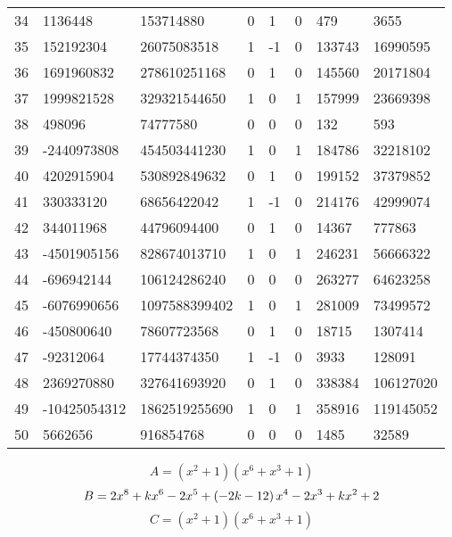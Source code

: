 \documentclass{amsart}
\begin{document}
\begin{longtable}{|l|l|l|lllll|}
34&1136448&153714880&0&1&0&479&3655\\
35&152192304&26075083518&1&-1&0&133743&16990595\\
36&1691960832&278610251168&0&1&0&145560&20171804\\
37&1999821528&329321544650&1&0&1&157999&23669398\\
38&498096&74777580&0&0&0&132&593\\
39&-2440973808&454503441230&1&0&1&184786&32218102\\
40&4202915904&530892849632&0&1&0&199152&37379852\\
41&330333120&68656422042&1&-1&0&214176&42999074\\
42&344011968&44796094400&0&1&0&14367&777863\\
43&-4501905156&828674013710&1&0&1&246231&56666322\\
44&-696942144&106124286240&0&0&0&263277&64623258\\
45&-6076990656&1097588399402&1&0&1&281009&73499572\\
46&-450800640&78607723568&0&1&0&18715&1307414\\
47&-92312064&17744374350&1&-1&0&3933&128091\\
48&2369270880&327641693920&0&1&0&338384&106127020\\
49&-10425054312&1862519255690&1&0&1&358916&119145052\\
50&5662656&916854768&0&0&0&1485&32589\\
\hline
\end{longtable}
$$A=(x^2
 + 1)(x^6
 + x^3
 + 1)$$
$$B=2\*x^8
 + k\*x^6
 - 2\*x^5
 + \left(-2\*k
 - 12\right) \*x^4
 - 2\*x^3
 + k\*x^2
 + 2$$
$$C=(x^2
 + 1)(x^6
 + x^3
 + 1)$$
\end{document}
